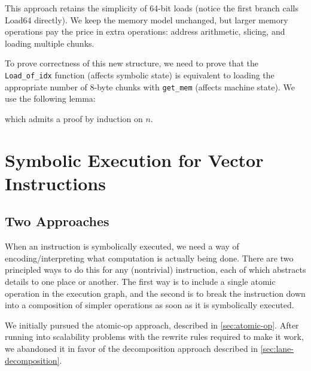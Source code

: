 This approach retains the simplicity of 64-bit loads (notice the first branch calls Load64 directly).
We keep the memory model unchanged, but larger memory operations pay the price in extra operations: address arithmetic, slicing, and loading multiple chunks.

To prove correctness of this new structure, we need to prove that the \texttt{Load_of_idx} function (affects symbolic state) is equivalent to loading the appropriate number of 8-byte chunks with \texttt{get_mem} (affects machine state).
We use the following lemma:


which admits a proof by induction on $n$.



\chapter{Symbolic Execution for Vector Instructions}
\label{ch:symex}


\section{Two Approaches}
\label{sec:two-approaches}

When an instruction is symbolically executed, we need a way of encoding/interpreting what computation is actually being done.
There are two principled ways to do this for any (nontrivial) instruction, each of which abstracts details to one place or another.
The first way is to include a single atomic operation in the execution graph, and the second is to break the instruction down into a composition of simpler operations as soon as it is symbolically executed.

We initially pursued the atomic-op approach, described in \autoref{sec:atomic-op}.
After running into scalability problems with the rewrite rules required to make it work, we abandoned it in favor of the decomposition approach described in \autoref{sec:lane-decomposition}.

